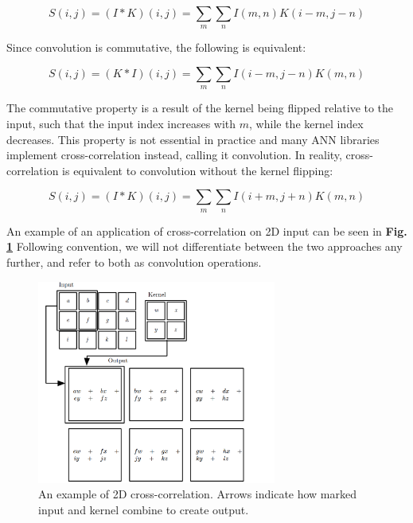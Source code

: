 \begin{equation}
S(i, j) = (I*K)(i, j) = \sum_{m} \sum_{n} I(m, n) K(i-m, j-n)
\end{equation}

\noindent Since convolution is commutative, the following is equivalent:

\begin{equation}
S(i, j) = (K*I)(i, j) = \sum_{m} \sum_{n} I(i-m, j-n) K(m, n)
\end{equation}

\noindent The commutative property is a result of the kernel being flipped relative to the input, such that the input index increases with $m$, while the kernel index decreases. This property is not essential in practice and many ANN libraries implement cross-correlation instead, calling it convolution. In reality, cross-correlation is equivalent to convolution without the kernel flipping:

\begin{equation}
S(i, j) = (I*K)(i, j) = \sum_{m} \sum_{n} I(i+m, j+n) K(m, n)
\end{equation}

\noindent An example of an application of cross-correlation on 2D input can be seen in \textbf{Fig. \ref{2d-conv}} Following convention, we will not differentiate between the two approaches any further, and refer to both as convolution operations. 

\begin{figure}[h!]
    \centering
        \includegraphics[width=0.7\textwidth]{fig/2d_conv.png}
        \caption{An example of 2D cross-correlation. Arrows indicate how marked input and kernel combine to create output.}
        \label{2d-conv}
\end{figure}
 

